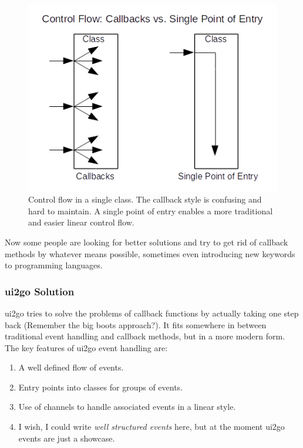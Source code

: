 \begin{figure}[ht]
\centering
\includegraphics[width=12cm]{img/callbacks.png}
\caption{Control flow in a single class. The callback style is
confusing and hard to maintain. A single point of entry enables
a more traditional and easier linear control flow.}
\end{figure}

Now some people are looking for better solutions and try to get rid of
callback methods by whatever means possible, sometimes even introducing
new keywords to programming languages.

\subsubsection{ui2go Solution}

ui2go tries to solve the problems of callback functions by actually
taking one step back (Remember the big boots approach?). It fits
somewhere in between traditional event handling and callback methods,
but in a more modern form. The key features of ui2go event handling are:

\begin{enumerate}
\item
  A well defined flow of events.
\item
  Entry points into classes for groups of events.
\item
  Use of channels to handle associated events in a linear style.
\item
  I wish, I could write \emph{well structured events} here, but at the
  moment ui2go events are just a showcase.
\end{enumerate}

